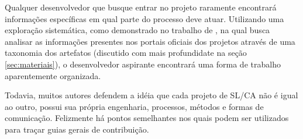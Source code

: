 Qualquer desenvolvedor que busque entrar no projeto raramente encontrará informações específicas em qual parte do processo deve atuar. Utilizando uma exploração sistemática, como demonstrado no trabalho de \cite{issue}, na qual busca analisar as informações presentes nos portais oficiais dos projetos através de uma taxonomia \cite{refframework} dos artefatos (discutido com mais profundidate na seção \ref{sec:materiais}), o desenvolvedor aspirante encontrará uma forma de trabalho aparentemente organizada. 

Todavia, muitos autores defendem a idéia que cada projeto de SL/CA não é igual ao outro, possui sua própria engenharia, processos, métodos e formas de comunicação. Felizmente há pontos semelhantes nos quais podem ser utilizados para traçar guias gerais de contribuição.

